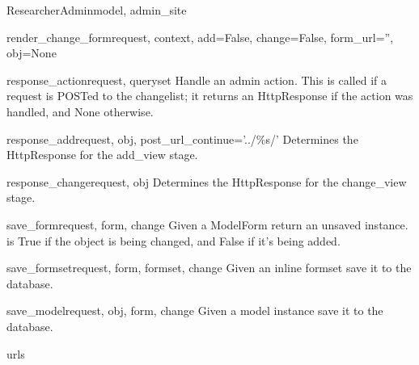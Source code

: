 \documentclass[letterpaper,10pt,english]{sphinxmanual}
\begin{document}
\begin{classdesc}{ResearcherAdmin}{model, admin\_site}
\hypertarget{data.admin.ResearcherAdmin.render_change_form}{}\begin{methoddesc}{render\_change\_form}{request, context, add=False, change=False, form\_url='', obj=None}\end{methoddesc}

\hypertarget{data.admin.ResearcherAdmin.response_action}{}\begin{methoddesc}{response\_action}{request, queryset}
Handle an admin action. This is called if a request is POSTed to the
changelist; it returns an HttpResponse if the action was handled, and
None otherwise.
\end{methoddesc}

\hypertarget{data.admin.ResearcherAdmin.response_add}{}\begin{methoddesc}{response\_add}{request, obj, post\_url\_continue='../\%s/'}
Determines the HttpResponse for the add\_view stage.
\end{methoddesc}

\hypertarget{data.admin.ResearcherAdmin.response_change}{}\begin{methoddesc}{response\_change}{request, obj}
Determines the HttpResponse for the change\_view stage.
\end{methoddesc}

\hypertarget{data.admin.ResearcherAdmin.save_form}{}\begin{methoddesc}{save\_form}{request, form, change}
Given a ModelForm return an unsaved instance.  is True if
the object is being changed, and False if it's being added.
\end{methoddesc}

\hypertarget{data.admin.ResearcherAdmin.save_formset}{}\begin{methoddesc}{save\_formset}{request, form, formset, change}
Given an inline formset save it to the database.
\end{methoddesc}

\hypertarget{data.admin.ResearcherAdmin.save_model}{}\begin{methoddesc}{save\_model}{request, obj, form, change}
Given a model instance save it to the database.
\end{methoddesc}

\hypertarget{data.admin.ResearcherAdmin.urls}{}\begin{memberdesc}{urls}\end{memberdesc}
\end{classdesc}
\end{document}
